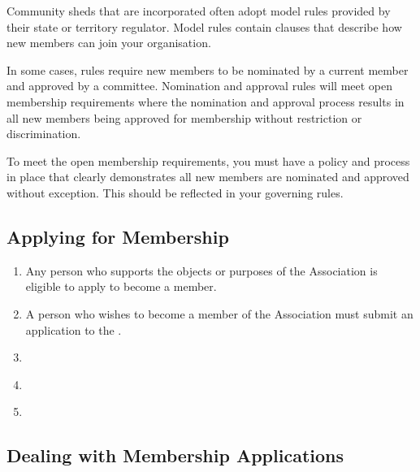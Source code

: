 \documentclass[../constitution.tex]{subfiles}
\begin{document}
{  Community sheds that are incorporated often adopt model rules provided by their state or territory regulator. Model rules contain clauses that describe how new members can join your organisation.

  In some cases, rules require new members to be nominated by a current member and approved by a committee. Nomination and approval rules will meet open membership requirements where the nomination and approval process results in all new members being approved for membership without restriction or discrimination.

  To meet the open membership requirements, you must have a policy and process in place that clearly demonstrates all new members are nominated and approved without exception. This should be reflected in your governing rules.
}


\subsection{Applying for Membership} \label{applying-for-membership}

\begin{enumerate}
\item Any person who  supports the objects or purposes of the Association is eligible to apply to become a member. \label{member-is-eligibile}
\item A person who wishes to become a member of the Association must submit an application to the . \label{member-must-submit-application}
\item {}
\item {} \label{eligible-for-class-of-membership}
\item {} \label{eligible-for-voting-rights}
\end{enumerate}

\subsection{Dealing with Membership Applications}\label{dealing-with-membership-applications}
\end{document}
